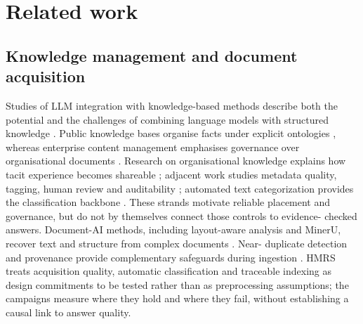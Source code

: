 \section{Related work}
\label{sec:related}

\subsection{Knowledge management and document acquisition}
Studies of LLM integration with knowledge-based methods describe both the
potential and the challenges of combining language models with structured
knowledge \citep{yang-kbs-llm-2025}. Public knowledge bases organise facts under explicit ontologies
\citep{auer-dbpedia-kb-2007,hoffart-yago2-kb-2013}, whereas enterprise content
management emphasises governance over organisational documents
\citep{paivarinta-ecm-2005,tyrvaainen-ecm-2006}. Research on organisational
knowledge explains how tacit experience becomes shareable
\citep{nonaka-seci-1994,nonaka-seci-ba-2000}; adjacent work studies metadata
quality, tagging, human review and auditability
\citep{park-metadata-quality-2009,golder-tagging-2006,mosqueira-rey-hitl-2022,barredo-arrieta-xai-2020}; automated text categorization provides the classification backbone \citep{sebastiani2002machine}. These strands motivate reliable placement
and governance, but do not by themselves connect those controls to evidence-
checked answers. Document-AI methods, including layout-aware analysis and
MinerU, recover text and structure from complex documents
\citep{zhong-publaynet-layout-2019,huang-layoutlmv3-docai-2022,mineru}. Near-
duplicate detection and provenance provide complementary safeguards during
ingestion \citep{manku-near-dup-2007,missier-prov-2013,cheney-provenance-2009}.
HMRS treats acquisition quality, automatic classification and traceable
indexing as design commitments to be tested rather than as preprocessing
assumptions; the campaigns measure where they hold and where they fail,
without establishing a causal link to answer quality.

